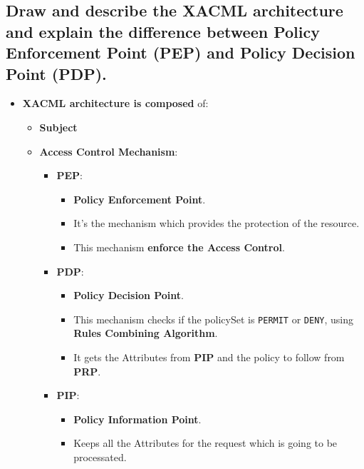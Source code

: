 \documentclass[9pt, letterpaper]{article}
\begin{document}
\newpage

\subsection{Draw and describe the XACML architecture and explain the difference between Policy Enforcement Point (PEP) and Policy Decision Point (PDP).}
\begin{itemize}
	\item \textbf{XACML architecture is composed} of:
	      \begin{itemize}
		      \item \textbf{Subject}
		      \item \textbf{Access Control Mechanism}:
		            \begin{itemize}
			            \item \textbf{PEP}:
			                  \begin{itemize}
				                  \item \textbf{Policy Enforcement Point}.
				                  \item It's the mechanism which provides the protection of the resource.
				                  \item This mechanism \textbf{enforce the Access Control}.
			                  \end{itemize}

			            \item \textbf{PDP}:
			                  \begin{itemize}
				                  \item \textbf{Policy Decision Point}.
				                  \item This mechanism checks if the policySet is {\tt PERMIT} or {\tt DENY}, using \textbf{Rules Combining Algorithm}.
				                  \item It gets the Attributes from \textbf{PIP} and the policy to follow from \textbf{PRP}.
			                  \end{itemize}

			            \item \textbf{PIP}:
			                  \begin{itemize}
				                  \item \textbf{Policy Information Point}.
				                  \item Keeps all the Attributes for the request which is going to be processated.
			                  \end{itemize}


\end{itemize}
\end{itemize}
\end{itemize}
\end{document}
